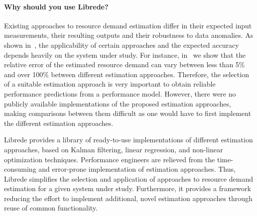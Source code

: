 \paragraph{Why should you use Librede?}
Existing approaches to resource demand estimation differ in their expected input measurements, their resulting outputs and their robustness to data anomalies. As shown in~\cite{Spinner2011a}, the applicability of certain approaches and the expected accuracy depends heavily on the system under study. For instance, in~\cite{Spinner2011a} we show that the relative error of the estimated resource demand can vary between less than 5\% and over 100\% between different estimation approaches. Therefore, the selection of a suitable estimation approach is very important to obtain reliable performance predictions from a performance model. However, there were no publicly available implementations of the proposed estimation approaches, making comparisons between them difficult as one would have to first implement the different estimation approaches. 

Librede provides a library of ready-to-use implementations of different estimation approaches, based on Kalman filtering, linear regression, and non-linear optimization techniques. Performance engineers are  relieved from the time-consuming and error-prone implementation of estimation approaches. Thus, Librede simplifies the selection and application of approaches to resource demand estimation for a given system under study. Furthermore, it provides a framework reducing the effort to implement additional, novel estimation approaches through reuse of common functionality.



